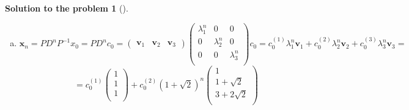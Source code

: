 \documentclass[12pt,a4]{article}
\newtheorem{solution}{Solution to the problem}
\newcommand{\bv}{{\mathbf v}}
\newcommand{\bx}{{\mathbf x}}
\begin{document}
{\begin{solution}[]
\begin{enumerate}[(a)]
\[P^{-1} = \frac1{4\sqrt2}
\begin{pmatrix}
2\sqrt2 & 4\sqrt2 & -2\sqrt2\\
-2+\sqrt2 & 2-2\sqrt2 & \sqrt2\\
2+\sqrt2 & -2-2\sqrt2 & \sqrt2\\
\end{pmatrix} =
\frac14
\begin{pmatrix}
2 & 4 & -2\\
1-\sqrt2 & -2+\sqrt2 & 1\\
1+\sqrt2 & -2-\sqrt2 & 1\\
\end{pmatrix}
\]
So:
\[
A = PDP^{-1} =
\begin{pmatrix}
1 & 1 & 1\\
1 & 1+\sqrt2 & 1-\sqrt2\\
1 & 3+2\sqrt2 & 3-2\sqrt2\\
\end{pmatrix}
\begin{pmatrix}
1 & 0 & 0 \\
0 & 1+\sqrt2 & 0\\
0 & 0 & 1-\sqrt2\\
\end{pmatrix}
\begin{pmatrix}
\frac12 & 1 & -\frac12\\
\frac{1-\sqrt2}4 & \frac{-2+\sqrt2}4 & \frac14\\
\frac{1+\sqrt2}4 & \frac{-2-\sqrt2}4 & \frac14\\
\end{pmatrix}
\]
	\item
\[
\bx_n = PD^nP^{-1}x_0 = PD^nc_0 =
\begin{pmatrix}
\bv_1 & \bv_2 & \bv_3
\end{pmatrix}
\begin{pmatrix}
\lambda_1^n & 0 & 0 \\
0 & \lambda_2^n & 0\\
0 & 0 & \lambda_3^n\\
\end{pmatrix}
c_0
=
c_0^{(1)} \lambda_1^n \bv_1 +
c_0^{(2)} \lambda_2^n \bv_2 +
c_0^{(3)} \lambda_3^n \bv_3
=
\]
\[
=
c_0^{(1)} 
\begin{pmatrix}
1 \\ 1 \\ 1\\
\end{pmatrix} +
c_0^{(2)} (1+\sqrt2)^n
\begin{pmatrix}
1 \\ 1+\sqrt2 \\ 3+2\sqrt2\\

\end{pmatrix}\]
\end{enumerate}
\end{solution}}
\end{document}

